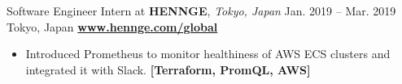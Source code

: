 \cveventflat
{Software Engineer Intern at }
{\textbf{HENNGE}, \textit{Tokyo, Japan}}
{Jan. 2019 -- Mar. 2019}
{Tokyo, Japan}
\newline
\href{https://hennge.com/global/}{\textbf{www.hennge.com/global}}
\begin{itemize}
    \item Introduced Prometheus to monitor healthiness of AWS ECS clusters and integrated it with Slack.
    \newline
    \textbf{[Terraform, PromQL, AWS]}
\end{itemize}
